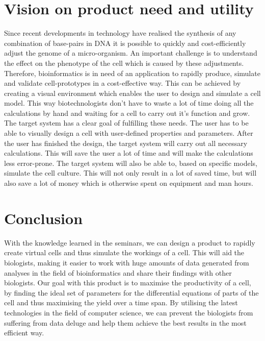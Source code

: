 \documentclass[10pt,a4paper]{report}
\begin{document}
	\section{Vision on product need and utility}
		Since recent developments in technology have realised the synthesis of any combination of base-pairs in DNA it is possible to quickly and cost-efficiently adjust the genome of a micro-organism. An important challenge is to understand the effect on the phenotype of the cell which is caused by these adjustments.\\		
		Therefore, bioinformatics is in need of an application to rapidly produce, simulate and validate cell-prototypes in a cost-effective way. This can be achieved by creating a visual environment which enables the user to design and simulate a cell model. This way biotechnologists don't have to waste a lot of time doing all the calculations by hand and waiting for a cell to carry out it's function and grow.\\
		The target system has a clear goal of fulfilling these needs. The user has to be able to visually design a cell with user-defined properties and parameters. After the user has finished the design, the target system will carry out all necessary calculations. This will save the user a lot of time and will make the calculations less error-prone. The target system will also be able to, based on specific models, simulate the cell culture. This will not only result in a lot of saved time, but will also save a lot of money which is otherwise spent on equipment and man hours.\\
		
	\section{Conclusion}
	With the knowledge learned in the seminars, we can design a product to rapidly create virtual cells and thus simulate the workings of a cell. This will aid the biologists, making it easier to work with huge amounts of data generated from analyses in the field of bioinformatics and share their findings with other biologists. Our goal with this product is to maximise the productivity of a cell, by finding the ideal set of parameters for the differential equations of parts of the cell and thus maximising the yield over a time span. By utilising the latest technologies in the field of computer science, we can prevent the biologists from suffering from data deluge and help them achieve the best results in the most efficient way.
	
\end{document}
